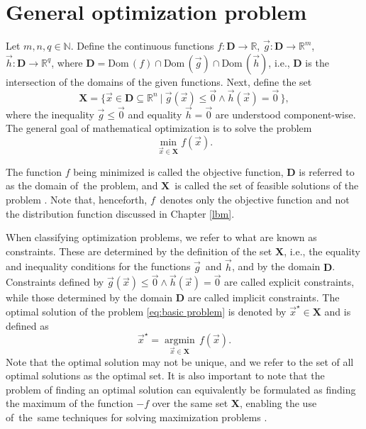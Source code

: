 \section{General optimization problem}

Let $m, n, q \in \mathbb{N}$. Define the continuous functions $f : \mathbf{D} \rightarrow \mathbb{R}$, $ \vec{g} : \mathbf{D} \rightarrow \mathbb{R}^m$, $ \vec{h} : \mathbf{D} \rightarrow \mathbb{R}^q $, where $ \mathbf{D} = \mathrm{Dom} \, (f) \cap \mathrm{Dom} \, (\vec{g}) \cap \mathrm{Dom} \, (\vec{h})$, i.e., $ \mathbf{D} $ is the intersection of the domains of the given functions. Next, define the set
\begin{equation}\label{eq:feasible solution}
	\mathbf{X} = \big\{ \vec{x} \in \mathbf{D} \subseteq \mathbb{R}^n \ | \ \vec{g} (\vec{x}) \leq \vec{0} \wedge \vec{h} (\vec{x}) = \vec{0} \, \big\},
\end{equation}
where the inequality $ \vec{g} \leq \vec{0} $ and equality $ \vec{h} = \vec{0} $ are understood component-wise. The general goal of mathematical optimization is to solve the problem
\begin{equation}\label{eq:basic problem}
	\min_{\vec{x} \in \mathbf{X}} f(\vec{x}).
\end{equation}

The function $f$ being minimized is called the objective function, $\mathbf{D}$ is referred to as the domain of~the problem, and $\mathbf{X}$~is called the set of feasible solutions of the problem \cite{Bert}. Note that, henceforth, $f$~denotes only the objective function and not the distribution function discussed in Chapter \ref{lbm}.

When classifying optimization problems, we refer to what are known as constraints. These are determined by the definition of the set $ \mathbf{X} $, i.e., the equality and inequality conditions for the functions $ \vec{g} $~and $ \vec{h} $, and by the domain $ \mathbf{D} $. Constraints defined by $ \vec{g} (\vec{x}) \leq \vec{0} \wedge \vec{h} (\vec{x}) = \vec{0} $ are called explicit constraints, while those determined by the domain $ \mathbf{D} $ are called implicit constraints.
The optimal solution of the problem \eqref{eq:basic problem} is denoted by $ \vec{x}^{\star} \in \mathbf{X} $ and is defined as
\begin{equation}
	\vec{x}^{\star} = \operatorname*{argmin}_{\vec{x} \in \mathbf{X}} \, f(\vec{x}).
\end{equation}
Note that the optimal solution may not be unique, and we refer to the set of all optimal solutions as the optimal set. It is also important to note that the problem of finding an optimal solution can equivalently be formulated as finding the maximum of the function $ -f$ over the same set $ \mathbf{X}$, enabling the use of~the~same techniques for solving maximization problems \cite{Bert, non-linear-textbook}.